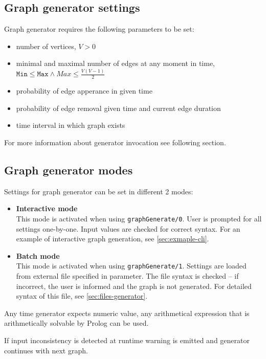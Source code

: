 \documentclass[11pt, a4paper,draft]{article}
\newcommand{\pl}[1]{\texttt{#1}} %
\theoremstyle{plain}
\theoremstyle{definition}
\theoremstyle{remark}
\begin{document}
\subsection{Graph generator settings}
\label{sec:generator-settings}

Graph generator requires the following parameters to be set:
\begin{itemize}
    \item number of vertices, $V > 0$
    \item minimal and maximal number of edges at any moment in time, 
        $\pl{Min} \le \pl{Max} \land Max \le \frac{ V(V-1)}{2}$
    \item probability of edge apperance in given time
    \item probability of edge removal given time and current edge duration
    \item time interval in which graph exists
\end{itemize}

For more information about generator invocation see following section.

\subsection{Graph generator modes}
\label{sec:generator-modes}
Settings for graph generator can be set in different 2 modes:
\begin{itemize}
\item \textbf{Interactive mode} \\
This mode is activated when using \pl{graphGenerate/0}. 
User is prompted for all settings one-by-one. Input values are checked for correct syntax. 
For an example of interactive graph generation, see \autoref{sec:exmaple-cli}.
\item \textbf{Batch mode} \\
This mode is activated when using \pl{graphGenerate/1}. 
Settings are loaded from external file specified in parameter. 
The file syntax is checked -- if incorrect, the user is informed and the graph is not generated. 
For detailed syntax of this file, see \autoref{sec:files-generator}.
\end{itemize}

Any time generator expects numeric value, any arithmetical expression
that is arithmetically solvable by Prolog can be used.

If input inconsistency is detected at runtime warning is emitted and generator
continues with next graph.
\end{document}
